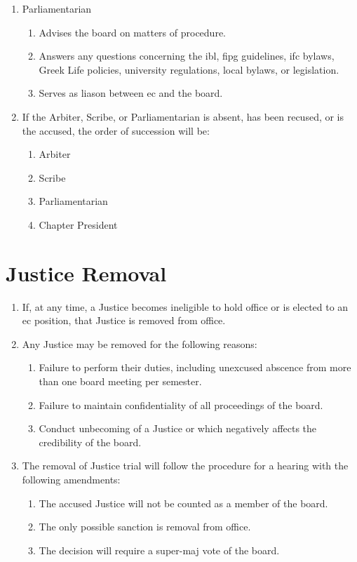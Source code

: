 \begin{enumerate}
		\item Parliamentarian
			\begin{enumerate}
				\item Advises the board on matters of procedure.
				\item Answers any questions concerning the \gls{ibl}, \gls{fipg} guidelines, \gls{ifc} bylaws, Greek Life policies, university regulations, local bylaws, or legislation.
				\item Serves as liason between \gls{ec} and the board.
			\end{enumerate}	

		\item If the Arbiter, Scribe, or Parliamentarian is absent, has been recused, or is the accused, the order of succession will be:
			\begin{enumerate}
				\item Arbiter
				\item Scribe
				\item Parliamentarian
				\item Chapter President
			\end{enumerate}

	\end{enumerate}

\section{Justice Removal}
	\begin{enumerate}
		\item If, at any time, a Justice becomes ineligible to hold office or is elected to an \gls{ec} position, that Justice is removed from office.
		\item Any Justice may be removed for the following reasons:
			\begin{enumerate}
				\item Failure to perform their duties, including unexcused abscence from more than one board meeting per semester.
				\item Failure to maintain confidentiality of all proceedings of the board.
				\item Conduct unbecoming of a Justice or which negatively affects the credibility of the board.
			\end{enumerate}
		\item The removal of Justice trial will follow the procedure for a hearing with the following amendments:
			\begin{enumerate}
				\item The accused Justice will not be counted as a member of the board.
				\item The only possible sanction is removal from office.
				\item The decision will require a \gls{super-maj} vote of the board.
			\end{enumerate}
	\end{enumerate}

